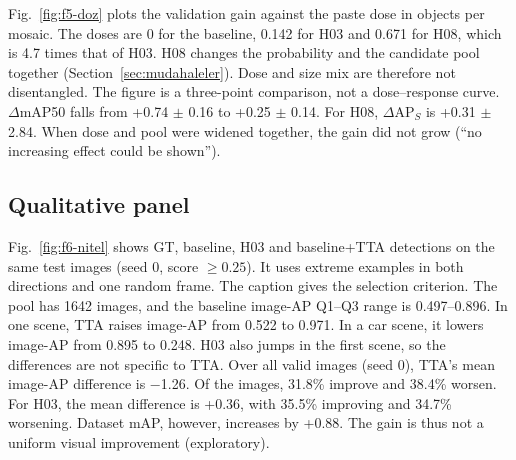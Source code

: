 Fig.~\ref{fig:f5-doz} plots the validation gain against the paste dose in objects per mosaic. The doses are 0 for the baseline, 0.142 for H03 and 0.671 for H08, which is 4.7 times that of H03. H08 changes the probability and the candidate pool together (Section~\ref{sec:mudahaleler}). Dose and size mix are therefore not disentangled. The figure is a three-point comparison, not a dose--response curve. $\Delta$mAP50 falls from +0.74 $\pm$ 0.16 to +0.25 $\pm$ 0.14. For H08, $\Delta$AP$_S$ is +0.31 $\pm$ 2.84. When dose and pool were widened together, the gain did not grow (``no increasing effect could be shown'').

\subsection{Qualitative panel}\label{sec:bulgu-nitel}



Fig.~\ref{fig:f6-nitel} shows GT, baseline, H03 and baseline+TTA detections on the same test images (seed 0, score $\ge0.25$). It uses extreme examples in both directions and one random frame. The caption gives the selection criterion. The pool has 1642 images, and the baseline image-AP Q1--Q3 range is 0.497--0.896. In one scene, TTA raises image-AP from 0.522 to 0.971. In a car scene, it lowers image-AP from 0.895 to 0.248. H03 also jumps in the first scene, so the differences are not specific to TTA. Over all valid images (seed 0), TTA's mean image-AP difference is $-$1.26. Of the images, 31.8\% improve and 38.4\% worsen. For H03, the mean difference is +0.36, with 35.5\% improving and 34.7\% worsening. Dataset mAP, however, increases by +0.88. The gain is thus not a uniform visual improvement (exploratory).

\FloatBarrier
